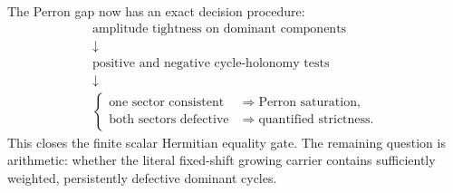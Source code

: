 The Perron gap now has an exact decision procedure:
\[
\begin{array}{c}
\text{amplitude tightness on dominant components}\\
\downarrow\\
\text{positive and negative cycle-holonomy tests}\\
\downarrow\\
\begin{cases}
\text{one sector consistent} &\Rightarrow \text{Perron saturation},\\
\text{both sectors defective} &\Rightarrow \text{quantified strictness}.
\end{cases}
\end{array}
\]
This closes the finite scalar Hermitian equality gate.  The remaining
question is arithmetic: whether the literal fixed-shift growing carrier
contains sufficiently weighted, persistently defective dominant
cycles.
